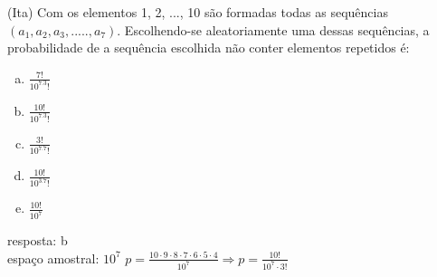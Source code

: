 \begin{ex}
   (Ita) Com os elementos 1, 2, ..., 10 são formadas todas as sequências $(a_1, a_2, a_3,.....,a_7)$. Escolhendo-se aleatoriamente uma dessas sequências, a probabilidade de a sequência escolhida não conter elementos repetidos é:
   \begin{enumerate} [(a)]
       \item $\frac{7!}{10^7.3!}$ 
       \item $\frac{10!}{10^7.3!}$
       \item $\frac{3!}{10^7.7!}$
       \item $\frac{10!}{10^3.7!}$
       \item $\frac{10!}{10^7}$
   \end{enumerate}
    \begin{sol}
     resposta: b \\
     espaço amostral: $10^7$ \hspace{0,6cm}
    $p=\frac{10\cdot9\cdot8\cdot7\cdot6\cdot5\cdot4}{10^7} \Longrightarrow p=\frac{10!}{10^7\cdot3!}$
    \end{sol}
  \end{ex}